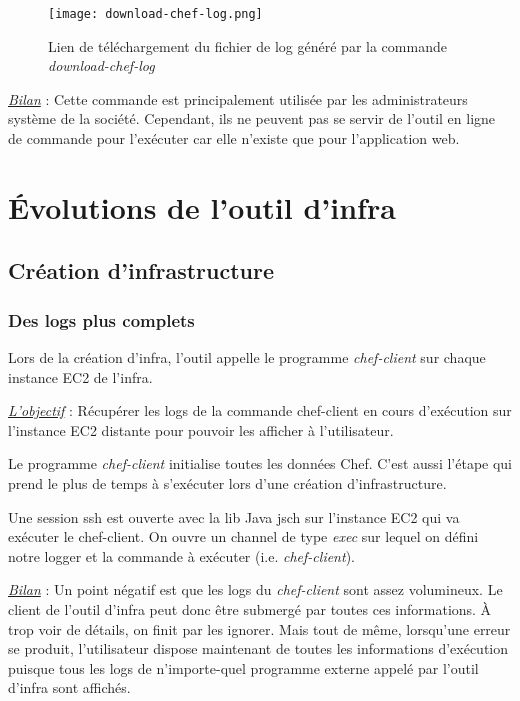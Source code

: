 \begin{figure}[H]
  \texttt{[image: download-chef-log.png]}
  \caption{Lien de téléchargement du fichier de log généré par la commande \textit{download-chef-log}}
\end{figure}

\underline{\textit{Bilan}} : Cette commande est principalement utilisée par les
administrateurs système de la société. Cependant, ils ne peuvent pas se servir
de l'outil en ligne de commande pour l'exécuter car elle n'existe que pour
l'application web.

\section{Évolutions de l'outil d'infra}

\subsection{Création d'infrastructure}

\subsubsection{Des logs plus complets}

Lors de la création d'infra, l'outil appelle le programme \textit{chef-client}
sur chaque instance EC2 de l'infra. 

\underline{\textit{L'objectif}} : Récupérer les logs de la commande chef-client
en cours d'exécution sur l'instance EC2 distante pour pouvoir les afficher à
l'utilisateur.

Le programme \textit{chef-client} initialise toutes les données Chef.
C'est aussi l'étape qui prend le plus de temps à s'exécuter lors d'une création
d'infrastructure.

Une session ssh est ouverte avec la lib Java jsch sur l'instance EC2 qui va
exécuter le chef-client. On ouvre un channel de type \textit{exec} sur lequel on
défini notre logger et la commande à exécuter (i.e. \textit{chef-client}).

\underline{\textit{Bilan}} : Un point négatif est que les logs du
\textit{chef-client} sont assez volumineux. Le client de l'outil d'infra 
peut donc être submergé par toutes ces informations. À trop voir de détails, on
finit par les ignorer. Mais tout de même, lorsqu'une erreur se produit,
l'utilisateur dispose maintenant de toutes les informations d'exécution puisque
tous les logs de n'importe-quel programme externe appelé par l'outil d'infra
sont affichés.

